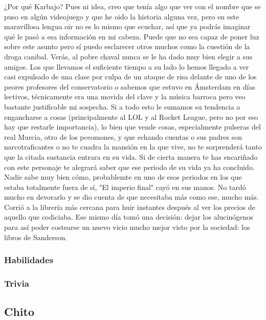 \documentclass[letterpaper]{article}
\begin{document}
¿Por qué Karbajo? Pues ni idea, creo que tenía algo que ver con el nombre que se puso en algún videojuego y que he oido la historia alguna vez, pero en este 
maravillosa lengua oir no es lo mismo que ecuchar, así que ya podrás imaginar qué le pasó a esa información en mi cabeza. Puede que no sea capaz de poner luz sobre 
este  asunto pero sí puedo esclarecer otros muchos como la cuestión de la droga canibal. Verás, al pobre chaval nunca se le ha dado muy bien elegir a sus amigos. 
Los que llevamos  el suficiente tiempo a su lado lo hemos llegado a ver casi expulsado de una clase por culpa de un ataque de risa delante de uno de los peores 
profesores del conservatorio o sabemos que estuvo en Ámsterdam en días lectivos, técnicamente era una movida del clave y la música barroca pero veo bastante 
justificable mi sospecha. Si a todo esto le sumamos su tendencia a engancharse a cosas (principalmente al LOL y al Rocket League, pero no por eso hay que restarle 
importancia), lo bien que vende cosas, especialmente pulseras del real Murcia, otro de los pceomones, y que echando cuentas o sus padres son narcotraficantes o no 
te cuadra la mansión en la que vive, no te sorprenderá tanto que la citada sustancia entrara  en su vida. Si de cierta manera te has encariñado con este personaje 
te alegrará saber que ese periodo de su vida ya ha concluido. Nadie sabe muy bien cómo, probablemte en uno de esos periodos en los que estaba totalmente fuera de 
sí, "El imperio final" cayó en sus manos. No tardó mucho en devorarlo y se dio cuenta de que necesitaba más como ese, mucho más. Corrió a la librería más cercana 
para huir instantes después al ver los precios de aquello que codiciaba. Ese mismo día tomó una decisión: dejar los alucinógenos para así poder costearse un nuevo 
vicio mucho mejor visto por la sociedad: los libros de Sanderson.\\


\subsubsection{Habilidades}

\subsubsection{Trivia}

\subsection{Chito}
\end{document}
